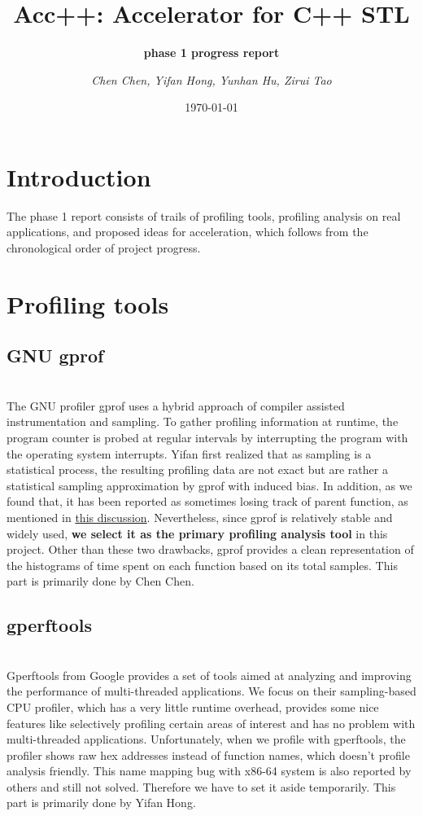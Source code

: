 \documentclass[9pt]{article}
\title{\textbf{Acc++: Accelerator for C++ STL}}
\subtitle{\textbf{phase 1 progress report}}
\author{\textit{Chen Chen, Yifan Hong, Yunhan Hu, Zirui Tao}}
\date{\today}
\begin{document}
\maketitle
\section{Introduction}
The phase 1 report consists of trails of profiling tools, profiling analysis on real applications, and proposed ideas for acceleration, which follows from the chronological order of project progress.

\section{Profiling tools} 
\subsection{GNU gprof} \label{sec:gprof}\\
The GNU profiler gprof \cite{graham1982gprof} uses a hybrid approach of compiler assisted instrumentation and sampling. To gather profiling information at runtime, the program counter is probed at regular intervals by interrupting the program with the operating system interrupts. Yifan first realized that as sampling is a statistical process, the resulting profiling data are not exact but are rather a statistical sampling approximation by gprof with induced bias. In addition, as we found that, it has been reported as sometimes losing track of parent function, as mentioned in \href{https://stackoverflow.com/questions/16664288/some-doubts-about-the-graph-generated-by-gprof-and-gprof2dot}{this discussion}. Nevertheless, since gprof is relatively stable and widely used, \textbf{we select it as the primary profiling analysis tool} in this project. Other than these two drawbacks, gprof provides a clean representation of the histograms of time spent on each function based on its total samples. This part is primarily done by Chen Chen. 

\subsection{gperftools} \label{sec:gperftools}\\
Gperftools \cite{gperftools} from Google provides a set of tools aimed at analyzing and improving the performance of multi-threaded applications. We focus on their sampling-based CPU profiler, which has a very little runtime overhead, provides some nice features like selectively profiling certain areas of interest and has no problem with multi-threaded applications. Unfortunately, when we profile with gperftools, the profiler shows raw hex addresses instead of function names, which doesn't profile analysis friendly. This name mapping bug with x86-64 system is also reported by others and still not solved. Therefore we have to set it aside temporarily. This part is primarily done by Yifan Hong. 
\end{document}
